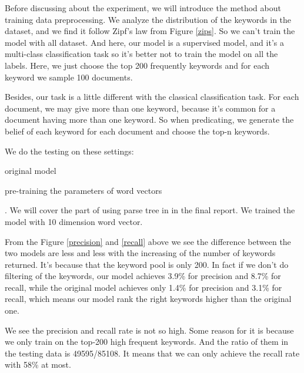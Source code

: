 \documentclass[dvips,9pt]{article}
\begin{document}
        Before discussing about the experiment, we will introduce the method about training data preprocessing. We analyze the distribution of the keywords in the dataset, and we find it follow Zipf's law from Figure \ref{zips}. So we can't train the model with all dataset. And here, our model is a supervised model, and it's a multi-class classification task so it's better not to train the model on all the labels. Here, we just choose the top 200 frequently keywords and for each keyword we sample 100 documents.
        
        Besides, our task is a little different with the classical classification task. For each document, we may give more than one keyword, because it's common for a document having more than one keyword. So when predicating, we generate the belief of each keyword for each document and choose the top-n keywords.
        
        We do the testing on these settings:\begin{inparaenum}[(i)]
            \item original model
            \item pre-training the parameters of word vectors
        \end{inparaenum}. We will cover the part of using parse tree in in the final report. We trained the model with 10 dimension word vector.
        
        From the Figure \ref{precision} and \ref{recall} above we see the difference between the two models are less and less with the increasing of the number of keywords returned. It's because that the keyword pool is only 200. In fact if we don't do filtering of the keywords, our model achieves 3.9\% for precision and 8.7\% for recall, while the original model achieves only 1.4\% for precision and 3.1\% for recall, which means our model rank the right keywords higher than the original one.
        
        We see the precision and recall rate is not so high. Some reason for it is because we only train on the top-200 high frequent keywords. And the ratio of them in the testing data is 49595/85108. It means that we can only achieve the recall rate with 58\% at most.
\end{document}
